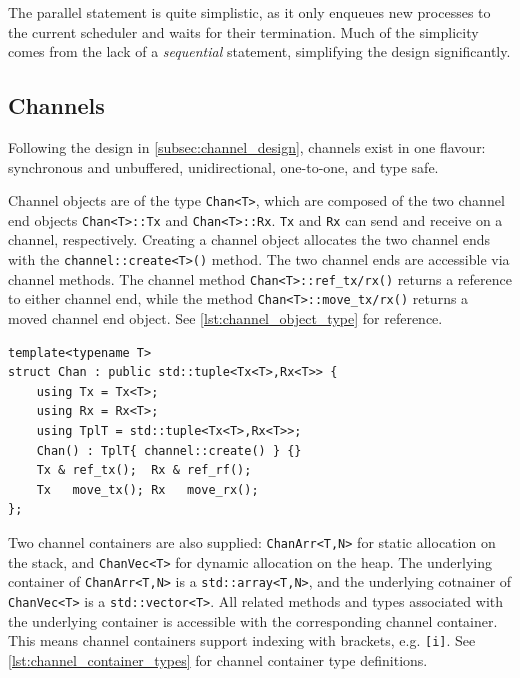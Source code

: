 The parallel statement is quite simplistic, as it only enqueues new processes to the current scheduler and waits for their termination. Much of the simplicity comes from the lack of a \textit{sequential} statement, simplifying the design significantly. 


\subsection{Channels}


Following the design in \cref{subsec:channel_design}, channels exist in one flavour: synchronous and unbuffered, unidirectional, one\hyp{}to\hyp{}one, and type safe. 

Channel objects are of the type \lstinline[style={CustomC++}]|Chan<T>|, which are composed of the two channel end objects \lstinline[style={CustomC++}]|Chan<T>::Tx| and \lstinline[style={CustomC++}]|Chan<T>::Rx|. \lstinline[style={CustomC++}]|Tx| and \lstinline[style={CustomC++}]|Rx| can send and receive on a channel, respectively. Creating a channel object allocates the two channel ends with the \lstinline[style={CustomC++}]|channel::create<T>()| method. The two channel ends are accessible via channel methods. The channel method \lstinline[style={CustomC++}]|Chan<T>::ref_tx/rx()| returns a reference to either channel end, while the method \lstinline[style={CustomC++}]|Chan<T>::move_tx/rx()| returns a moved channel end object. See \cref{lst:channel_object_type} for reference.

\begin{lstfloat}
\begin{lstlisting}[caption={Channel object type.}, label={lst:channel_object_type}, style={CustomC++}, xleftmargin={2em}]
template<typename T>
struct Chan : public std::tuple<Tx<T>,Rx<T>> {
    using Tx = Tx<T>;
    using Rx = Rx<T>;
    using TplT = std::tuple<Tx<T>,Rx<T>>;
    Chan() : TplT{ channel::create() } {}
    Tx & ref_tx();  Rx & ref_rf();
    Tx   move_tx(); Rx   move_rx();
};
\end{lstlisting}
\end{lstfloat}

Two channel containers are also supplied: \lstinline[style={CustomC++}]|ChanArr<T,N>| for static allocation on the stack, and \lstinline[style={CustomC++}]|ChanVec<T>| for dynamic allocation on the heap. The underlying container of \lstinline[style={CustomC++}]|ChanArr<T,N>| is a \lstinline[style={CustomC++}]|std::array<T,N>|, and the underlying cotnainer of \lstinline[style={CustomC++}]|ChanVec<T>| is a \lstinline[style={CustomC++}]|std::vector<T>|. All related methods and types associated with the underlying container is accessible with the corresponding channel container. This means channel containers support indexing with brackets, e.g. \lstinline[style={CustomC++}]|[i]|. See \cref{lst:channel_container_types} for channel container type definitions.

